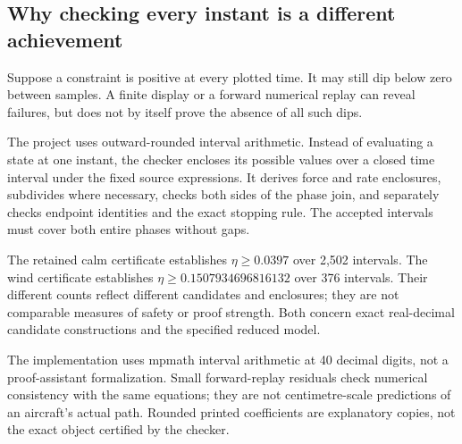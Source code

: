 \subsection*{Why checking every instant is a different achievement}
Suppose a constraint is positive at every plotted time. It may still dip below zero between samples. A finite display or a forward numerical replay can reveal failures, but does not by itself prove the absence of all such dips.


The project uses outward-rounded interval arithmetic. Instead of evaluating a state at one instant, the checker encloses its possible values over a closed time interval under the fixed source expressions. It derives force and rate enclosures, subdivides where necessary, checks both sides of the phase join, and separately checks endpoint identities and the exact stopping rule. The accepted intervals must cover both entire phases without gaps.

The retained calm certificate establishes $\eta\geq0.0397$ over 2,502 intervals. The wind certificate establishes $\eta\geq0.1507934696816132$ over 376 intervals. Their different counts reflect different candidates and enclosures; they are not comparable measures of safety or proof strength. Both concern exact real-decimal candidate constructions and the specified reduced model.


The implementation uses mpmath interval arithmetic at 40 decimal digits, not a proof-assistant formalization. Small forward-replay residuals check numerical consistency with the same equations; they are not centimetre-scale predictions of an aircraft's actual path. Rounded printed coefficients are explanatory copies, not the exact object certified by the checker.
\par\medskip
